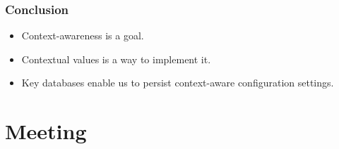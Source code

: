 \begin{frame}
	\frametitle{Conclusion}

	\begin{itemize}[<+-| alert@+>]
	\item Context-awareness is a goal.
	\item Contextual values is a way to implement it.
	\item Key databases enable us to persist context-aware configuration settings.
	\end{itemize}
\end{frame}



\section{Meeting}


